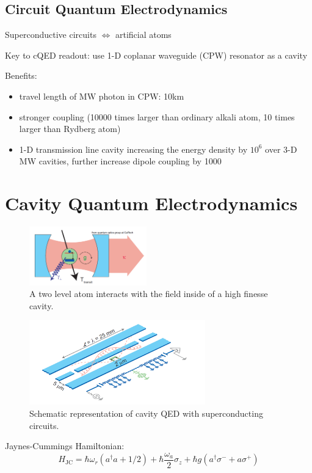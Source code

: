 \documentclass[8pt,a4paper,twocolumn]{article} %
\numberwithin{equation}{section} %
\begin{document}
		\subsection{Circuit Quantum Electrodynamics} %
		\label{sub:circuit_quantum_electrodynamics}
			Superconductive circuits $\Longleftrightarrow $ artificial atoms

			Key to cQED readout: use 1-D coplanar waveguide (CPW) resonator as a cavity

			Benefits:
			\begin{itemize}
				\item travel length of MW photon in CPW: 10km
				\item stronger coupling (10000 times larger than ordinary alkali atom, 10 times larger than Rydberg atom)
				\item 1-D transmission line cavity increasing the energy density by $10^6$ over 3-D MW cavities, further increase dipole coupling by 1000
			\end{itemize}



	\section{Cavity Quantum Electrodynamics} %
	\label{sec:cavity_quantum_electrodynamics}
		\begin{figure}[!h]
			\centering
			\includegraphics[width=2in]{cavityQED.png}
			\caption{A two level atom interacts with the field inside of a high finesse cavity. \cite{Schuster2007}}
			\label{pic:EnLevelOfJCH}
		\end{figure}
		\begin{figure}[!h]
			\centering
			\includegraphics[width=3in]{cQEDwithSuCondQubit.png}
			\caption{Schematic representation of cavity QED with superconducting circuits. \cite{Schuster2007}}
			\label{pic:EnLevelOfJCH}
		\end{figure}
		Jaynes-Cummings Hamiltonian:
		\begin{equation}
			H_{\text{JC}} = \hbar \omega_r (a^{\dagger}a+1/2)+ \hbar \frac{\omega_a}{2} \sigma_z + \hbar g ( a^{\dagger} \sigma^- + a \sigma^+ )
		\end{equation}
\end{document}
